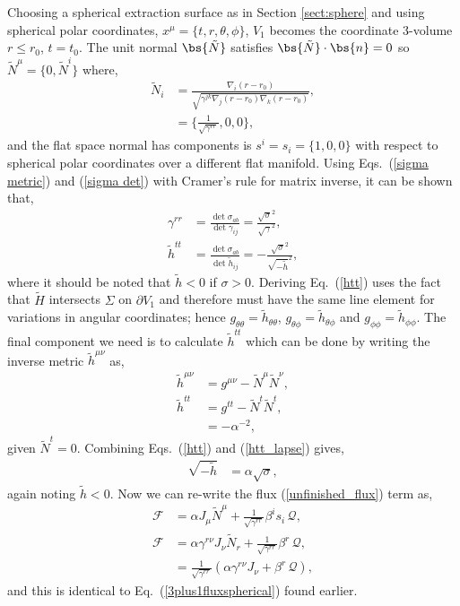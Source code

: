 Choosing a spherical extraction surface as in Section \ref{sect:sphere} and using spherical polar coordinates, $x^\mu = \{t,r,\theta,\phi\}$, $V_1$ becomes the coordinate 3-volume $r\leq r_0$, $t=t_0$. The unit normal $\bs{\tilde{N}}$ satisfies $\bs{\tilde{N}}\cdot \bs{n} =0$ so $\tilde N^\mu = \{0,\tilde N^i\}$ where, 
\begin{align}
\tilde N_i &= \frac{\nabla_i (r-r_0)}{\sqrt{\gamma^{jk}\nabla_j (r-r_0) \nabla_k (r-r_0)}}, \\ 
 &= \{\frac{1}{\sqrt{\gamma^{rr}}},0,0\},
\end{align}
and the flat space normal has components is $s^i = s_i = \{1,0,0\}$ with respect to spherical polar coordinates over a different flat manifold. Using Eqs.~(\ref{sigma metric}) and (\ref{sigma det}) with Cramer's rule for matrix inverse, it can be shown that,
\begin{align}
\gamma^{rr} &= \frac{\det \sigma_{ab}}{ \det \gamma_{ij}} = \frac{\sqrt{\sigma}^2}{\sqrt{\gamma}^2}, \\ 
\label{htt}\tilde{h}^{tt} &= \frac{\det \sigma_{ab}}{\det \tilde h_{ij}} = -\frac{\sqrt{\sigma}^2}{\sqrt{-\tilde h}^2},
\end{align}
where it should be noted that $\tilde h < 0$ if $\sigma > 0$. Deriving Eq.~(\ref{htt}) uses the fact that $\tilde H$ intersects $\Sigma$ on $\partial V_1$ and therefore must have the same line element for variations in angular coordinates; hence $g_{\theta\theta}=\tilde{h}_{\theta\theta}$, $g_{\theta\phi}=\tilde{h}_{\theta\phi}$ and $g_{\phi\phi}=\tilde{h}_{\phi\phi}$. The final component we need is to calculate $\tilde h^{tt}$ which can be done by writing the inverse metric $\tilde{h}^{\mu\nu}$ as, 
\begin{align}
\tilde{h}^{\mu\nu} &= g^{\mu\nu} - \tilde{N}^\mu \tilde{N}^\nu,\\
\tilde{h}^{tt} &= g^{tt} - \tilde{N}^t\tilde{N}^t,\\
         \label{htt_lapse}      &= -\alpha^{-2},
\end{align}
given $\tilde{N}^t=0$. Combining Eqs.~(\ref{htt}) and (\ref{htt_lapse}) gives,
\begin{align}
  \sqrt{-\tilde{h}} &= \alpha \sqrt{\sigma},
\end{align}
again noting $\tilde h<0$. Now we can re-write the flux (\ref{unfinished_flux}) term as, 
\begin{align}
\mathcal{F} &= \alpha J_\mu \tilde N^\mu +  \frac{1}{\sqrt{\gamma^{rr}}}\beta^i s_i\, \mathcal{Q} , \\
\mathcal{F} &= \alpha\gamma^{ r\nu} J_\nu \tilde N_r +  \frac{1}{\sqrt{\gamma^{rr}}}\beta^r \, \mathcal{Q} , \\
            &= \frac{1}{\sqrt{\gamma^{rr}}}( \alpha \gamma^{ r\nu} J_\nu +  \beta^r \, \mathcal{Q} ), 
\end{align} 
and this is identical to Eq.~(\ref{3plus1fluxspherical}) found earlier.






